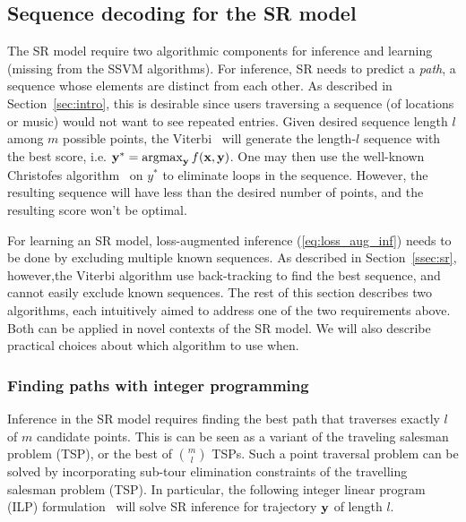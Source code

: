 
\subsection{Sequence decoding for the SR model}
\label{ssec:subtour}

The SR model require two algorithmic components for inference and learning
(missing from the SSVM algorithms).
For inference, SR needs to predict a {\em path}, \ie a sequence whose elements are distinct from each other.
As described in Section~\ref{sec:intro}, this is desirable since users traversing a sequence (of locations or music)
would not want to see repeated entries.
Given desired sequence length $l$ among $m$ possible points, the Viterbi~\cite{tsochantaridis2005large}
will generate the length-$l$ sequence with the best score, i.e. $\mathbf{y}^* = \operatorname*{argmax}_{\mathbf{y}} f(\mathbf{x},\mathbf{y})$.
One may then use the well-known
Christofes algorithm~\cite{christofides1976} on $y^*$ to eliminate loops in the sequence.
However, the resulting sequence will have less than the desired number of points, and the resulting score won't be optimal.

For learning an SR model, loss-augmented inference (\ref{eq:loss_aug_inf}) needs to be done by excluding multiple known sequences.
As described in Section~\ref{ssec:sr}, %
however,the Viterbi algorithm use back-tracking to find the best sequence,
and cannot easily exclude known sequences.
The rest of this section describes two algorithms, each intuitively aimed to address one of the two requirements above.
Both can be applied in novel contexts of the SR model.
We will also describe practical choices about which algorithm to use when.


\subsubsection{Finding paths with integer programming}
Inference in the SR model requires finding the best path that traverses exactly $l$ of $m$ candidate points.
This is can be seen as a variant of the traveling salesman problem (TSP), or the best of ${m \choose l}$ TSPs.
Such a point traversal problem can be solved by incorporating
sub-tour elimination constraints of the travelling salesman problem (TSP).
In particular, the following integer linear program (ILP) formulation~\cite{ijcai15,cikm16paper}
will solve SR inference for trajectory $\mathbf{y}$ of length $l$.


